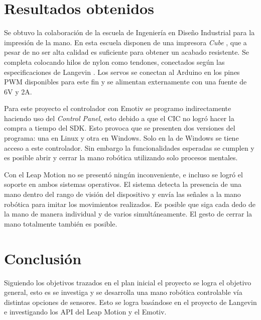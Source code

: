 \documentclass[letterpaper,journal,transmag]{IEEEtran}
\begin{document}
\section{Resultados obtenidos}
Se obtuvo la colaboración de la escuela de Ingeniería en Diseño Industrial para
la impresión de la mano. En esta escuela disponen de una impresora \emph{Cube}
\cite{_cubify_????}, que a pesar de no ser alta calidad es suficiente para
obtener un acabado resistente. Se completa colocando hilos de nylon como
tendones, conectados según las especificaciones de Langevin
\cite{langevin_inmoov_????}. Los servos se conectan al Arduino en los pines PWM
disponibles para este fin y se alimentan externamente con una fuente de 6V y 2A.

Para este proyecto el controlador con Emotiv se programo indirectamente
haciendo uso del \emph{Control Panel}, esto debido a que el CIC no logró hacer
la compra a tiempo del SDK. Esto provoca que se presenten dos versiones del
programa: una en Linux y otra en Windows. Solo en la de Windows se tiene acceso
a este controlador. Sin embargo la funcionalidades esperadas se cumplen y es
posible abrir y cerrar la mano robótica utilizando solo procesos mentales.

Con el Leap Motion no se presentó ningún inconveniente, e incluso se logró el
soporte en ambos sistemas operativos. El sistema detecta la presencia de una
mano dentro del rango de visión del dispositivo y envía las señales a la mano
robótica para imitar los movimientos realizados. Es posible que siga cada dedo
de la mano de manera individual y de varios simultáneamente. El gesto de cerrar
la mano totalmente también es posible.


\section{Conclusión}
Siguiendo los objetivos trazados en el plan inicial el proyecto se logra el
objetivo general, esto es se investiga y se desarrolla una mano robótica
controlable vía distintas opciones de sensores. Esto se logra basándose en el
proyecto de Langevin e investigando los API del Leap Motion y el Emotiv. 
\end{document}
